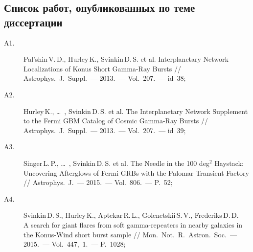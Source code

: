 \subsection*{\Large Список работ, опубликованных по теме диссертации}
\begin{description}
\item [A1.] Pal'shin\,V.\,D., Hurley\,K., Svinkin\,D.\,S. et al. Interplanetary Network Localizations of
Konus Short Gamma-Ray Bursts // Astrophys.~J.~Suppl.~--- 2013.~--- Vol.~207.~--- id~38;
\item [A2.] Hurley\,K., \dots\ , Svinkin\,D.\,S. et al. The Interplanetary Network Supplement to 
the Fermi GBM Catalog of Cosmic Gamma-Ray Bursts // Astrophys.~J.~Suppl.~--- 2013.~--- Vol.~207.~--- id~39;
\item [A3.] Singer\,L.\,P., \dots\ , Svinkin\,D.\,S. et al. The Needle in the 100 deg$^2$ Haystack: 
Uncovering Afterglows of Fermi GRBs with the Palomar Transient Factory // 
Astrophys.~J.~--- 2015.~--- Vol.~806.~--- P.~52;
\item [A4.] Svinkin\,D.\,S., Hurley\,K., Aptekar\,R.\,L., Golenetskii\,S.\,V., Frederiks\,D.\,D. \\ 
A search for giant flares from soft gamma-repeaters in nearby galaxies in the 
Konus-Wind short burst sample // Mon.~Not.~R.~Astron.~Soc.~--- 2015.~--- Vol.~447,~1.~--- P.~1028;

\end{description}

\renewcommand{\refname}{Литература, цитируемая в автореферате}


